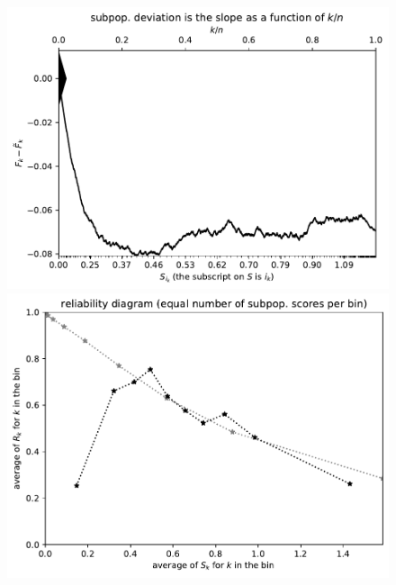 \documentclass{article}
\begin{document}
\begin{figure}
\begin{centering}

\parbox{\imsize}{\includegraphics[width=\imsize]
                {./codes/unweighted/nll-1-248-Eskimo-dog-husky}}
\quad\quad
\parbox{\imsize}{\includegraphics[width=\imsize]
                {./codes/unweighted/nll-1-248-Eskimo-dog-huskyequisamps10}}

\vspace{\vertsep}


\end{centering}
\end{figure}
\end{document}
